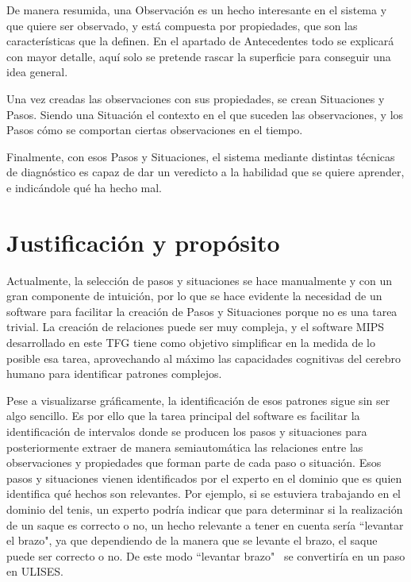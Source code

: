 De manera resumida, una Observaci\'on es un hecho interesante en el sistema y que quiere ser observado, y 
est\'a compuesta por propiedades, que son las caracter\'isticas que la definen. En el 
apartado de Antecedentes todo se explicar\'a con mayor detalle, aqu\'i solo se pretende rascar la superficie para 
conseguir una idea general.

Una vez creadas las observaciones con sus propiedades, se crean Situaciones y Pasos. Siendo una Situaci\'on el contexto
en el que suceden las observaciones, y los Pasos c\'omo se comportan ciertas observaciones en el tiempo.

Finalmente, con esos Pasos y Situaciones, el sistema mediante distintas t\'ecnicas de diagn\'ostico 
es capaz de dar un veredicto
a la habilidad que se quiere aprender, e indic\'andole qu\'e ha hecho mal.

\section{Justificaci\'{o}n y prop\'osito}
Actualmente, la selecci\'on de pasos y situaciones se hace manualmente y con un gran componente de intuici\'on,
por lo que se hace evidente la necesidad de un software para facilitar la creaci\'on de Pasos y Situaciones porque
no es una tarea trivial. La creaci\'on de relaciones puede ser muy compleja, y el software MIPS desarrollado
en este TFG
tiene como objetivo simplificar en la medida de lo posible esa tarea, aprovechando al m\'aximo las capacidades
cognitivas del cerebro humano para identificar
patrones complejos. 

Pese a visualizarse gr\'aficamente, la identificaci\'on de esos patrones sigue sin ser algo sencillo. Es
por ello que la tarea principal del software es facilitar la identificaci\'on de intervalos donde se producen los
pasos y situaciones para posteriormente extraer de manera semiautom\'atica las relaciones entre las observaciones y
propiedades que forman parte de cada paso o situaci\'on. Esos pasos y situaciones vienen identificados por el
experto en el dominio que es quien identifica qu\'e hechos son relevantes. 
Por ejemplo, si se estuviera trabajando en el dominio del tenis, un experto podr\'ia indicar que 
para determinar si la realizaci\'on de un saque es correcto o no, un hecho relevante a tener en cuenta ser\'ia 
``levantar el brazo", ya que dependiendo de la manera que se levante el brazo, el saque puede ser correcto o 
no. De este modo ``levantar brazo" \ se convertiría en un paso en ULISES.

